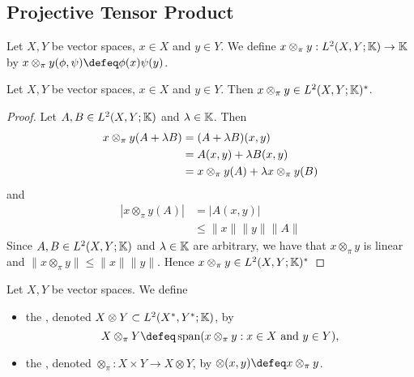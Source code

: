 \documentclass{book}
\begin{document}
\subsection{Projective Tensor Product}

\begin{defn}
	Let $X, Y$ be vector spaces, $x \in X$ and $y \in Y$. We define $x \otimes_{\pi} y: L^2(X, Y; \mathbb{K}) \rightarrow  \mathbb{K}$ by $x \otimes_{\pi} y(\phi, \psi) \defeq \phi(x) \psi(y)$.  
\end{defn}

\begin{ex}
	Let $X, Y$ be vector spaces, $x \in X$ and $y \in Y$. Then $x \otimes_{\pi} y \in L^2(X, Y; \mathbb{K})^*$. 
\end{ex}

\begin{proof}
	Let $A, B \in L^2(X, Y; \mathbb{K})$ and $\lambda \in \mathbb{K}$. Then 
	\begin{align*}
		x \otimes_{\pi} y(A + \lambda B) 
		& = (A + \lambda B) (x,y) \\
		& = A(x,y) + \lambda B(x,y) \\
		& = x \otimes_{\pi} y(A) + \lambda x \otimes_{\pi} y(B)
	\end{align*}
	and 
	\begin{align*}
		|x \otimes_{\pi} y (A)|
		& = |A(x,y)| \\
		& \leq \|x\| \|y\| \|A\| 
	\end{align*}
	Since $A, B \in L^2(X, Y; \mathbb{K})$ and $\lambda \in \mathbb{K}$ are arbitrary, we have that $x \otimes_{\pi} y$ is linear and $\|x \otimes_{\pi} y\| \leq \|x\| \|y\|$. Hence $x \otimes_{\pi} y \in L^2(X, Y; \mathbb{K})^*$ 
\end{proof}

\begin{defn}
	Let $X, Y$ be vector spaces. We define  
	\begin{itemize}
		\item the , denoted $X \otimes Y \subset L^2(X^*, Y^*; \mathbb{K})$, by 
		$$X \otimes_{\pi} Y \defeq \spn(\text{$x \otimes_{\pi} y: x \in X$ and $y \in Y$}),$$
		\item the , denoted $\otimes_{\pi}: X \times Y \rightarrow X \otimes Y$, by $\otimes(x, y) \defeq x \otimes_{\pi} y$.
	\end{itemize}
\end{defn}
\end{document}

